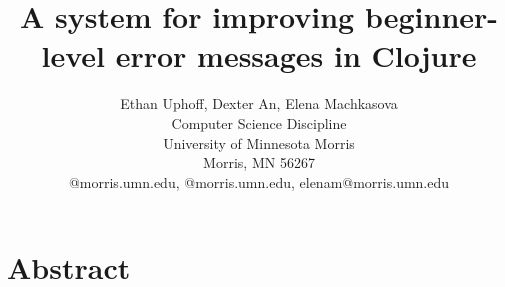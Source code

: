 \documentclass[12pt]{article}
\newcommand{\comment}[1]{{\bf \tt  {#1}}}
\begin{document}
\pagestyle{plain}
%

\title{A system for improving beginner-level error messages in Clojure}
%
%

\author{
Ethan Uphoff, Dexter An, Elena Machkasova \\
Computer Science Discipline \\
University of Minnesota Morris\\
Morris, MN 56267\\
@morris.umn.edu, @morris.umn.edu, elenam@morris.umn.edu
}
\maketitle
\thispagestyle{empty}

\section*{\centering Abstract}


\newpage
\setcounter{page}{1}
\end{document}

